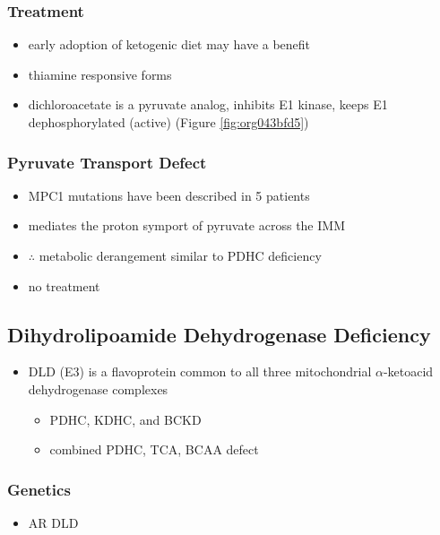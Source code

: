 \documentclass{scrartcl}
\begin{document}
\subsubsection{Treatment}
\label{sec:org828354a}
\begin{itemize}
\item early adoption of ketogenic diet may have a benefit
\item thiamine responsive forms
\item dichloroacetate is a pyruvate analog, inhibits E1 kinase, keeps E1
dephosphorylated (active) (Figure \ref{fig:org043bfd5})
\end{itemize}

\subsubsection{Pyruvate Transport Defect}
\label{sec:orgee296c3}
\begin{itemize}
\item MPC1 mutations have been described in 5 patients
\item mediates the proton symport of pyruvate across the IMM
\item \(\therefore\) metabolic derangement similar to PDHC deficiency
\item no treatment
\end{itemize}

\subsection{Dihydrolipoamide Dehydrogenase Deficiency}
\label{sec:org5a925a6}
\begin{itemize}
\item DLD (E3) is a flavoprotein common to all three mitochondrial
\(\alpha\)-ketoacid dehydrogenase complexes
\begin{itemize}
\item PDHC, KDHC, and BCKD
\item combined PDHC, TCA, BCAA defect
\end{itemize}
\end{itemize}
\subsubsection{Genetics}
\label{sec:org24d2d01}
\begin{itemize}
\item AR DLD
\end{itemize}
\end{document}
